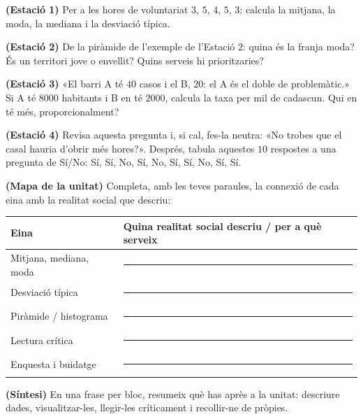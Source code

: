 \begin{exercicis}
\begin{exlist}
  \item \textbf{(Estació 1)} Per a les hores de voluntariat $3$, $5$, $4$, $5$, $3$:
        calcula la mitjana, la moda, la mediana i la desviació típica.
  \item \textbf{(Estació 2)} De la piràmide de l'exemple de l'Estació 2: quina és la
        franja moda? És un territori jove o envellit? Quins serveis hi prioritzaries?
  \item \textbf{(Estació 3)} «El barri A té $40$ casos i el B, $20$: el A és el doble
        de problemàtic.» Si A té $\num{8000}$ habitants i B en té $\num{2000}$, calcula
        la taxa per mil de cadascun. Qui en té més, proporcionalment?
  \item \textbf{(Estació 4)} Revisa aquesta pregunta i, si cal, fes-la neutra: «No
        trobes que el casal hauria d'obrir més hores?». Després, tabula aquestes $10$
        respostes a una pregunta de Sí/No: Sí, Sí, No, Sí, No, Sí, Sí, No, Sí, Sí.
  \item \textbf{(Mapa de la unitat)} Completa, amb les teves paraules, la connexió de
        cada eina amb la realitat social que descriu:
        \begin{center}
        \renewcommand{\arraystretch}{1.4}
        \begin{tabular}{p{4.8cm} p{7.8cm}}
        \toprule
        \textbf{Eina} & \textbf{Quina realitat social descriu / per a què serveix} \\
        \midrule
        Mitjana, mediana, moda & \rule{7.2cm}{0.4pt} \\
        Desviació típica & \rule{7.2cm}{0.4pt} \\
        Piràmide / histograma & \rule{7.2cm}{0.4pt} \\
        Lectura crítica & \rule{7.2cm}{0.4pt} \\
        Enquesta i buidatge & \rule{7.2cm}{0.4pt} \\
        \bottomrule
        \end{tabular}
        \end{center}
  \item \textbf{(Síntesi)} En una frase per bloc, resumeix què has après a la unitat:
        descriure dades, visualitzar-les, llegir-les críticament i recollir-ne de
        pròpies.
\end{exlist}
\end{exercicis}

